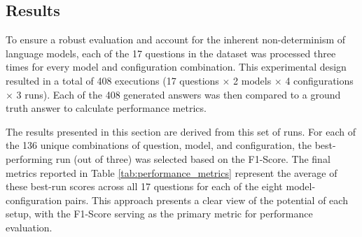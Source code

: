     \subsection{Results}

        To ensure a robust evaluation and account for the inherent non-determinism of language models, each of the 17 questions in the dataset was processed three times for every model and configuration combination. This experimental design resulted in a total of 408 executions (17 questions $\times$ 2 models $\times$ 4 configurations $\times$ 3 runs). Each of the 408 generated answers was then compared to a ground truth answer to calculate performance metrics.

        The results presented in this section are derived from this set of runs. For each of the 136 unique combinations of question, model, and configuration, the best-performing run (out of three) was selected based on the F1-Score. The final metrics reported in Table \ref{tab:performance_metrics} represent the average of these best-run scores across all 17 questions for each of the eight model-configuration pairs. This approach presents a clear view of the potential of each setup, with the F1-Score serving as the primary metric for performance evaluation.

